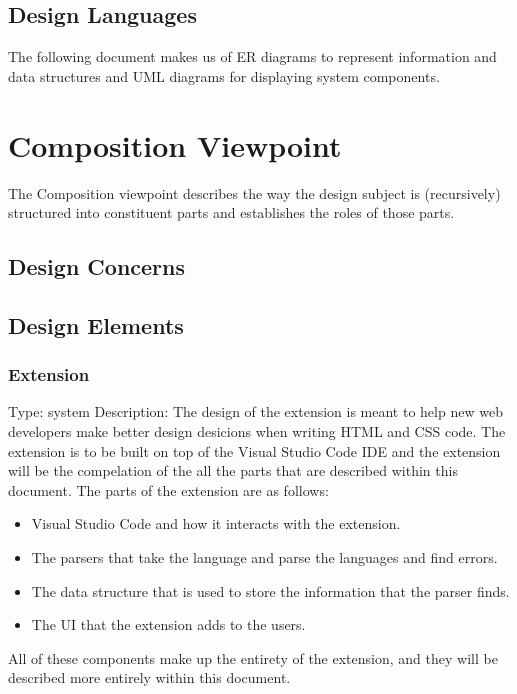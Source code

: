 \documentclass[letterpaper,10pt,titlepage,draftclsnofoot,onecolumn,onesided] {IEEEtran}
\begin{document}
\subsection{Design Languages}
The following document makes us of ER diagrams to represent information and data structures and UML diagrams for displaying system components. 






\section{Composition Viewpoint}
The Composition viewpoint describes the way the design subject is (recursively) structured into constituent
parts and establishes the roles of those parts. 
\subsection{Design Concerns}

\subsection{Design Elements}

	\subsubsection{Extension}
	Type: system
	Description: The design of the extension is meant to help new web developers make better design desicions when writing HTML and CSS code.
	The extension is to be built on top of the Visual Studio Code IDE and the extension will be the compelation of the all the parts that are described within this document. 
	The parts of the extension are as follows:
	\begin{itemize}
	\item Visual Studio Code and how it interacts with the extension.
	\item The parsers that take the language and parse the languages and find errors.
	\item The data structure that is used to store the information that the parser finds.
	\item The UI that the extension adds to the users. 
	\end{itemize}
	All of these components make up the entirety of the extension, and they will be described more entirely within this document. 
	
\end{document}

